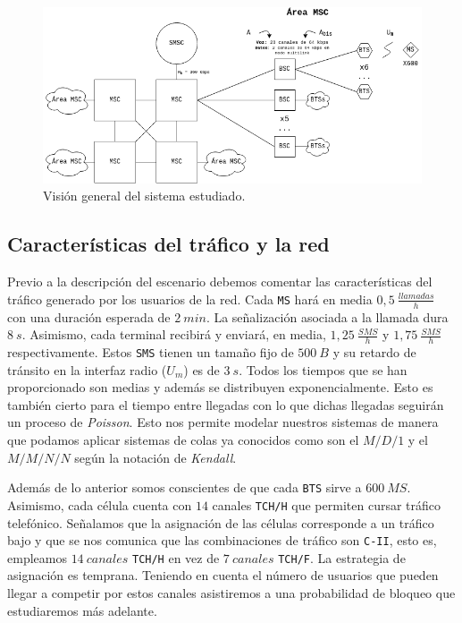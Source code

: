 \documentclass[10pt]{article}
\begin{document}
			\begin{figure}
				\centering
				\includegraphics[width=1\linewidth]{GSM_system.png}
				\caption{Visión general del sistema estudiado.}
				\label{f:general_sys}
			\end{figure}

		\subsection{Características del tráfico y la red}
			Previo a la descripción del escenario debemos comentar las características del tráfico generado por los usuarios de la red. Cada \texttt{MS} hará en media $0,5\ \frac{llamadas}{h}$ con una duración esperada de $2\ min$. La señalización asociada a la llamada dura $8\ s$. Asimismo, cada terminal recibirá y enviará, en media, $1,25\ \frac{SMS}{h}$ y $1,75\ \frac{SMS}{h}$ respectivamente. Estos \texttt{SMS} tienen un tamaño fijo de $500\ B$ y su retardo de tránsito en la interfaz radio ($U_m$) es de $3\ s$. Todos los tiempos que se han proporcionado son medias y además se distribuyen exponencialmente. Esto es también cierto para el tiempo entre llegadas con lo que dichas llegadas seguirán un proceso de \textit{Poisson}. Esto nos permite modelar nuestros sistemas de manera que podamos aplicar sistemas de colas ya conocidos como son el $M/D/1$ y el $M/M/N/N$ según la notación de \textit{Kendall}.

			Además de lo anterior somos conscientes de que cada \texttt{BTS} sirve a $600\ MS$. Asimismo, cada célula cuenta con $14$ canales \texttt{TCH/H} que permiten cursar tráfico telefónico. Señalamos que la asignación de las células corresponde a un tráfico bajo y que se nos comunica que las combinaciones de tráfico son \texttt{C-II}, esto es, empleamos $14\ canales$ \texttt{TCH/H} en vez de $7\ canales$ \texttt{TCH/F}. La estrategia de asignación es temprana. Teniendo en cuenta el número de usuarios que pueden llegar a competir por estos canales asistiremos a una probabilidad de bloqueo que estudiaremos más adelante.
\end{document}
